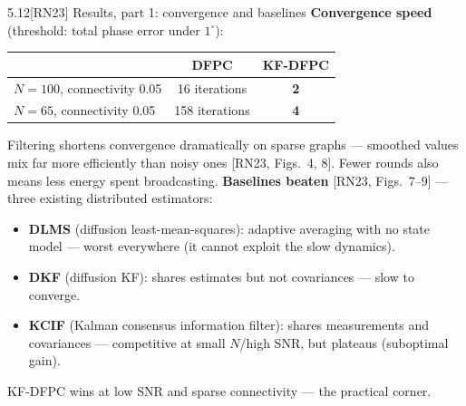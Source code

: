 \documentclass[10pt]{beamer}
\newcommand{\RN}[1]{\textcolor{blue!50!black}{[RN23#1]}}
\newcommand{\srcline}[1]{\par\vfill\noindent{\tiny\textcolor{gray}{Source: #1}}}
\begin{document}
\begin{frame}{5.12\quad \RN{} Results, part 1: convergence and baselines}
\textbf{Convergence speed} (threshold: total phase error under
$1^\circ$):
\begin{center}
\small
\begin{tabular}{lcc}
\toprule
 & DFPC & KF-DFPC\\
\midrule
$N{=}100$, connectivity 0.05 & 16 iterations & \textbf{2}\\
$N{=}65$, connectivity 0.05 & 158 iterations & \textbf{4}\\
\bottomrule
\end{tabular}
\end{center}
Filtering shortens convergence dramatically on sparse graphs ---
smoothed values mix far more efficiently than noisy ones
\RN{, Figs.~4, 8}. Fewer rounds also means less energy spent
broadcasting.
\vspace{1ex}
\textbf{Baselines beaten} \RN{, Figs.~7--9} --- three existing
distributed estimators:
\begin{itemize}
\item \textbf{DLMS} (diffusion least-mean-squares): adaptive averaging
with no state model --- worst everywhere (it cannot exploit the slow
dynamics).
\item \textbf{DKF} (diffusion KF): shares estimates but not
covariances --- slow to converge.
\item \textbf{KCIF} (Kalman consensus information filter): shares
measurements and covariances --- competitive at small $N$/high SNR, but
plateaus (suboptimal gain).
\end{itemize}
KF-DFPC wins at low SNR and sparse connectivity --- the practical
corner.
\srcline{[RN23] \S V, Figs.~4, 7--9.}
\end{frame}
\end{document}

